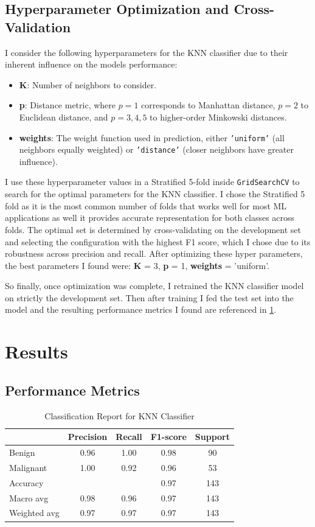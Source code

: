 \documentclass{article}
\begin{document}
\subsection{Hyperparameter Optimization and Cross-Validation}
I consider the following hyperparameters for the KNN classifier due to their inherent influence on the models performance:
\begin{itemize}
    \item \textbf{K}: Number of neighbors to consider.
    \item \textbf{p}: Distance metric, where $p=1$ corresponds to Manhattan distance, $p=2$ to Euclidean distance, and $p=3,4,5$ to higher-order Minkowski distances.
    \item \textbf{weights}: The weight function used in prediction, either \texttt{'uniform'} (all neighbors equally weighted) or \texttt{'distance'} (closer neighbors have greater influence).
\end{itemize}

I use these hyperparameter values in a Stratified 5-fold inside \texttt{GridSearchCV} to search for the optimal parameters for the KNN classifier. I chose the Stratified 5 fold as it is the most common number of folds that works well for most ML applications as well it provides accurate representation for both classes across folds. The optimal set is determined by cross-validating on the development set and selecting the configuration with the highest F1 score, which I chose due to its robustness across precision and recall. After optimizing these hyper parameters, the best parameters I found were: \textbf{K} = 3, \textbf{p} = 1, \textbf{weights} = 'uniform'.

So finally, once optimization was complete, I retrained the KNN classifier model on strictly the development set. Then after training I fed the test set into the model and the resulting performance metrics I found are referenced in \ref{tab:report}.

\section{Results}
\subsection{Performance Metrics}
\begin{table}[H]
	\centering
	\caption{Classification Report for KNN Classifier}
	\begin{tabular}{lcccc}
		\hline
		& Precision & Recall & F1-score & Support \\
		\hline
		Benign & 0.96 & 1.00 & 0.98 & 90 \\
		Malignant & 1.00 & 0.92 & 0.96 & 53 \\
		\hline
		Accuracy & & & 0.97 & 143 \\
		Macro avg & 0.98 & 0.96 & 0.97 & 143 \\
		Weighted avg & 0.97 & 0.97 & 0.97 & 143 \\
		\hline
	\end{tabular}
	\label{tab:report}
\end{table}
\end{document}
